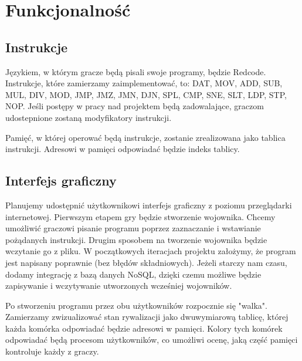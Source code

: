 {\let\clearpage\relax \chapter{Funkcjonalność}}
\section{Instrukcje}
Językiem, w którym gracze będą pisali swoje programy, będzie Redcode. Instrukcje, które zamierzamy zaimplementować, to: DAT, MOV, ADD, SUB, MUL, DIV, MOD, JMP, JMZ, JMN, DJN, SPL, CMP, SNE, SLT, LDP, STP, NOP. Jeśli postępy w pracy nad projektem będą zadowalające, graczom udostepnione zostaną modyfikatory instrukcji.

Pamięć, w której operować będą instrukcje, zostanie zrealizowana jako tablica instrukcji. Adresowi w pamięci odpowiadać będzie indeks tablicy.

\section{Interfejs graficzny}
Planujemy udostępnić użytkownikowi interfejs graficzny z poziomu przeglądarki internetowej. Pierwszym etapem gry będzie stworzenie wojownika. Chcemy umożliwić graczowi pisanie programu poprzez zaznaczanie i wstawianie pożądanych instrukcji. Drugim sposobem na tworzenie wojownika będzie wczytanie go z pliku. W początkowych iteracjach projektu założymy, że program jest napisany poprawnie (bez błędów składniowych).
Jeżeli starczy nam czasu, dodamy integrację z bazą danych NoSQL, dzięki czemu możliwe będzie zapisywanie i wczytywanie utworzonych wcześniej wojowników.

Po stworzeniu programu przez obu użytkowników rozpocznie się "walka". Zamierzamy zwizualizować stan rywalizacji jako dwuwymiarową tablicę, której każda komórka odpowiadać będzie adresowi w pamięci. Kolory tych komórek odpowiadać będą procesom użytkowników, co umożliwi ocenę, jaką część pamięci kontroluje każdy z graczy.